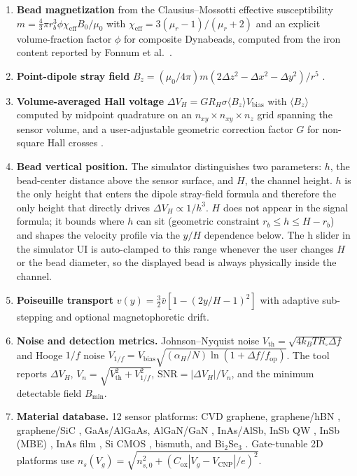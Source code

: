 \documentclass[preprint,12pt,a4paper]{elsarticle}
\begin{document}
\begin{enumerate}
\item \textbf{Bead magnetization} from the Clausius--Mossotti effective susceptibility
$m = \tfrac{4}{3}\pi r_b^3 \phi \chi_{\text{eff}} B_0 / \mu_0$ with $\chi_{\text{eff}} = 3(\mu_r{-}1)/(\mu_r{+}2)$ and an explicit volume-fraction factor $\phi$ for composite Dynabeads, computed from the iron content reported by Fonnum et al.\ \cite{fonnum2005}.

\item \textbf{Point-dipole stray field} $B_z = (\mu_0/4\pi) m (2\Delta z^2 - \Delta x^2 - \Delta y^2) / r^5$ \cite{griffiths}.

\item \textbf{Volume-averaged Hall voltage} $\Delta V_H = G R_H \sigma \langle B_z\rangle V_{\text{bias}}$ with $\langle B_z\rangle$ computed by midpoint quadrature on an $n_{xy} \times n_{xy} \times n_z$ grid spanning the sensor volume, and a user-adjustable geometric correction factor $G$ for non-square Hall crosses \cite{popovic2004}.

\item \textbf{Bead vertical position.} The simulator distinguishes two parameters: $h$, the bead-center distance above the sensor surface, and $H$, the channel height. $h$ is the only height that enters the dipole stray-field formula and therefore the only height that directly drives $\Delta V_H \propto 1/h^3$. $H$ does not appear in the signal formula; it bounds where $h$ can sit (geometric constraint $r_b \le h \le H - r_b$) and shapes the velocity profile via the $y/H$ dependence below. The h slider in the simulator UI is auto-clamped to this range whenever the user changes $H$ or the bead diameter, so the displayed bead is always physically inside the channel.

\item \textbf{Poiseuille transport} $v(y) = \tfrac{3}{2}\bar{v}[1 - (2y/H - 1)^2]$ with adaptive sub-stepping and optional magnetophoretic drift.

\item \textbf{Noise and detection metrics.} Johnson--Nyquist noise $V_{\text{th}} = \sqrt{4 k_B T R_\square \Delta f}$ and Hooge $1/f$ noise $V_{1/f} = V_{\text{bias}}\sqrt{(\alpha_H/N)\ln(1+\Delta f/f_{\text{op}})}$. The tool reports $\Delta V_H$, $V_n = \sqrt{V_{\text{th}}^2 + V_{1/f}^2}$, $\text{SNR} = |\Delta V_H|/V_n$, and the minimum detectable field $B_\text{min}$.

\item \textbf{Material database.} 12 sensor platforms: CVD graphene, graphene/hBN \cite{dauber2015,ouaj2025}, graphene/SiC \cite{ciuk2019,panchal2012}, GaAs/AlGaAs, AlGaN/GaN \cite{zhang2021,koide2012}, InAs/AlSb, InSb QW \cite{gilbertson2011}, InSb (MBE) \cite{togawa2005}, InAs film \cite{heremans1993}, Si CMOS \cite{besse2002}, bismuth, and Bi$_2$Se$_3$ \cite{saeed2024}. Gate-tunable 2D platforms use $n_s(V_g) = \sqrt{n_{s,0}^2 + (C_{\text{ox}}|V_g - V_{\text{CNP}}|/e)^2}$.


\end{enumerate}
\end{document}
